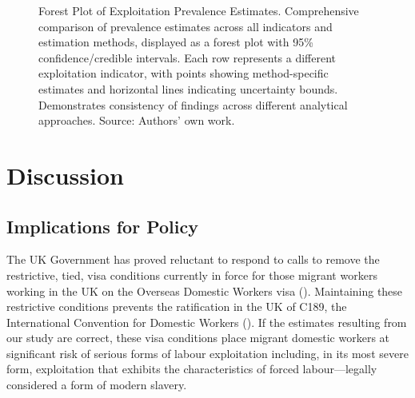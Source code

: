 \documentclass[
  12pt,
  letterpaper,
  DIV=11,
  numbers=noendperiod]{scrartcl}
\theoremstyle{plain}
\theoremstyle{definition}
\begin{document}
\begin{figure}[H]


\caption{\label{fig-forest-plot}Forest Plot of Exploitation Prevalence
Estimates. Comprehensive comparison of prevalence estimates across all
indicators and estimation methods, displayed as a forest plot with 95\%
confidence/credible intervals. Each row represents a different
exploitation indicator, with points showing method-specific estimates
and horizontal lines indicating uncertainty bounds. Demonstrates
consistency of findings across different analytical approaches. Source:
Authors' own work.}

\end{figure}%

\section{Discussion}\label{discussion}

\subsection{Implications for Policy}\label{implications-for-policy}

The UK Government has proved reluctant to respond to calls to remove the
restrictive, tied, visa conditions currently in force for those migrant
workers working in the UK on the Overseas Domestic Workers visa
(\textcite{gower_calls_2016}). Maintaining these restrictive conditions
prevents the ratification in the UK of C189, the International
Convention for Domestic Workers (\textcite{ILO11-indicators}). If the
estimates resulting from our study are correct, these visa conditions
place migrant domestic workers at significant risk of serious forms of
labour exploitation including, in its most severe form, exploitation
that exhibits the characteristics of forced labour---legally considered
a form of modern slavery.
\end{document}
